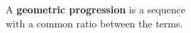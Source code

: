 \documentclass[border=6pt]{standalone}
\begin{document}
\parbox{3in}{A \textbf{geometric progression} is a sequence \\
with a common ratio between the terms.}
\end{document}
